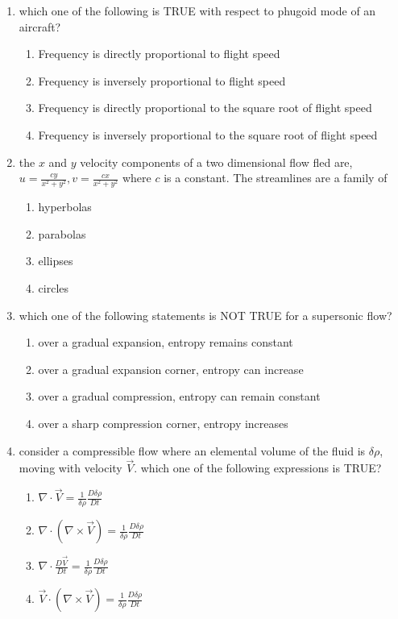 \documentclass[journal,12pt,onecolumn]{IEEEtran}
\theoremstyle{remark}
\begin{document}
\begin{enumerate}
\item which one of the following is TRUE with respect to phugoid mode of an aircraft?
\begin{enumerate}
    \item Frequency is directly proportional to flight speed
    \item Frequency is inversely proportional to flight speed
    \item Frequency is directly proportional to the square root of flight speed
    \item Frequency is inversely proportional to the square root of flight speed \\
\end{enumerate}

\item the $x$ and $y$ velocity components of a two dimensional flow fled are, $u=\frac{cy}{x^2+y^2},v=\frac{cx}{x^2+y^2}$ where $c$ is a constant. The streamlines are a family of 
\begin{enumerate}
    \item hyperbolas
    \item parabolas
    \item ellipses
    \item circles \\
\end{enumerate}

\item which one of the following statements is NOT TRUE for a supersonic flow?
\begin{enumerate}
   \item over a gradual expansion, entropy remains constant
    \item over a gradual expansion corner, entropy can increase
     \item over a gradual compression, entropy can remain constant
     \item over a sharp compression corner, entropy increases \\
\end{enumerate}

\item consider a compressible flow where an elemental volume of the fluid is $\delta \rho$, moving with velocity $\overrightarrow{V}$. which one of the following expressions is TRUE?
\begin{enumerate}
    \item $\nabla \cdot \overrightarrow{V}=\frac{1}{\delta \rho} \frac{D\delta \rho}{Dt}$
    \item $\nabla \cdot (\nabla \times \overrightarrow{V})=\frac{1}{\delta \rho} \frac{D\delta \rho}{Dt}$
    \item $\nabla \cdot \frac{D\overrightarrow{V}}{Dt}=\frac{1}{\delta \rho} \frac{D\delta \rho}{Dt}$
    \item $\overrightarrow{V} \cdot (\nabla \times \overrightarrow{V})=\frac{1}{\delta \rho} \frac{D\delta \rho}{Dt}$ \\
\end{enumerate}


\end{enumerate}
\end{document}

